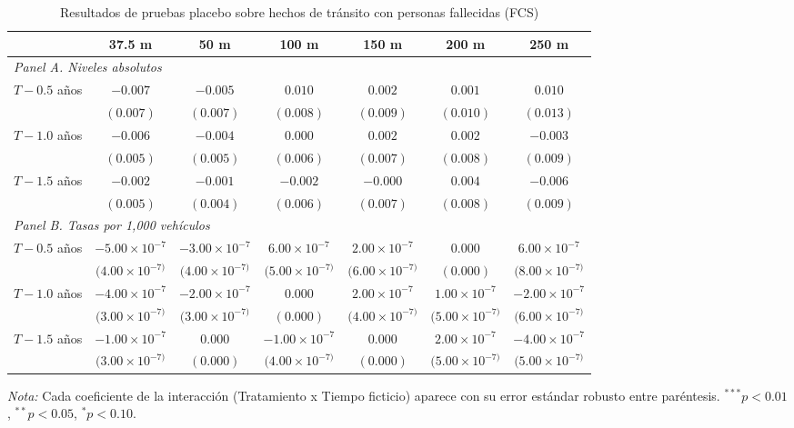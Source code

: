 \begin{table}[htbp]
    \centering
    \caption{Resultados de pruebas placebo sobre hechos de tránsito con personas fallecidas (FCS)}
    \label{tab:placebo-fcs}
    \footnotesize
    \begin{adjustbox}{max width=\textwidth}
    \begin{tabular}{lcccccc}
        \toprule
        & 37.5 m & 50 m & 100 m & 150 m & 200 m & 250 m \\
        \midrule
        \multicolumn{7}{l}{\textit{Panel A. Niveles absolutos}} \\
        $T - 0.5$ años & $-0.007$ & $-0.005$ & $0.010$ & $0.002$ & $0.001$ & $0.010$ \\
         & $(0.007)$ & $(0.007)$ & $(0.008)$ & $(0.009)$ & $(0.010)$ & $(0.013)$ \\
        $T - 1.0$ años & $-0.006$ & $-0.004$ & $0.000$ & $0.002$ & $0.002$ & $-0.003$ \\
         & $(0.005)$ & $(0.005)$ & $(0.006)$ & $(0.007)$ & $(0.008)$ & $(0.009)$ \\
        $T - 1.5$ años & $-0.002$ & $-0.001$ & $-0.002$ & $-0.000$ & $0.004$ & $-0.006$ \\
         & $(0.005)$ & $(0.004)$ & $(0.006)$ & $(0.007)$ & $(0.008)$ & $(0.009)$ \\
        \midrule
        \multicolumn{7}{l}{\textit{Panel B. Tasas por 1,000 vehículos}} \\
        $T - 0.5$ años & $-5.00\times 10^{-7}$ & $-3.00\times 10^{-7}$ & $6.00\times 10^{-7}$ & $2.00\times 10^{-7}$ & $0.000$ & $6.00\times 10^{-7}$ \\
         & $(4.00\times 10^{-7)}$ & $(4.00\times 10^{-7)}$ & $(5.00\times 10^{-7)}$ & $(6.00\times 10^{-7)}$ & $(0.000)$ & $(8.00\times 10^{-7)}$ \\
        $T - 1.0$ años & $-4.00\times 10^{-7}$ & $-2.00\times 10^{-7}$ & $0.000$ & $2.00\times 10^{-7}$ & $1.00\times 10^{-7}$ & $-2.00\times 10^{-7}$ \\
         & $(3.00\times 10^{-7)}$ & $(3.00\times 10^{-7)}$ & $(0.000)$ & $(4.00\times 10^{-7)}$ & $(5.00\times 10^{-7)}$ & $(6.00\times 10^{-7)}$ \\
        $T - 1.5$ años & $-1.00\times 10^{-7}$ & $0.000$ & $-1.00\times 10^{-7}$ & $0.000$ & $2.00\times 10^{-7}$ & $-4.00\times 10^{-7}$ \\
         & $(3.00\times 10^{-7)}$ & $(0.000)$ & $(4.00\times 10^{-7)}$ & $(0.000)$ & $(5.00\times 10^{-7)}$ & $(5.00\times 10^{-7)}$ \\
        \bottomrule
    \end{tabular}
    \end{adjustbox}

    \vspace{0.4em}
    \begin{minipage}{0.93\textwidth}
        \tiny \textit{Nota:} Cada coeficiente de la interacción (Tratamiento x Tiempo ficticio) aparece con su error estándar robusto entre paréntesis. ${}^{***} p<0.01$, ${}^{**} p<0.05$, ${}^{*} p<0.10$.
    \end{minipage}
\end{table}

